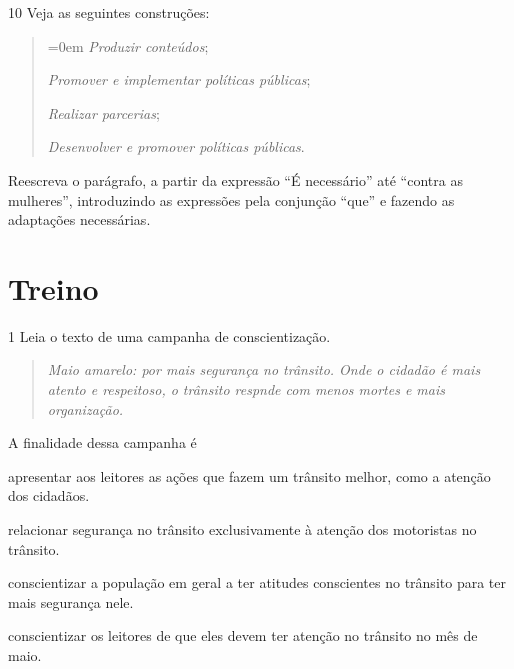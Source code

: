 \num{10} Veja as seguintes construções:

\begin{quote}\parindent=0em
\emph{Produzir conteúdos};

\emph{Promover e implementar políticas públicas};

\emph{Realizar parcerias};

\emph{Desenvolver e promover políticas públicas}.
\end{quote}

Reescreva o parágrafo, a partir da expressão ``É necessário'' até
``contra as mulheres'', introduzindo as expressões pela conjunção
``que'' e fazendo as adaptações necessárias.


\section{Treino}

\num{1} Leia o texto de uma campanha de conscientização.


\begin{quote}
\emph{Maio amarelo: por mais segurança no trânsito. Onde o
cidadão é mais atento e respeitoso, o trânsito respnde com menos mortes
e mais organização.}
\end{quote}

A finalidade dessa campanha é

\begin{escolha}
\item apresentar aos leitores as ações que fazem um trânsito melhor, como
a atenção dos cidadãos.

\item relacionar segurança no trânsito exclusivamente à atenção dos
motoristas no trânsito.

\item conscientizar a população em geral a ter atitudes conscientes no
trânsito para ter mais segurança nele.

\item conscientizar os leitores de que eles devem ter atenção no trânsito
no mês de maio.
\end{escolha}


